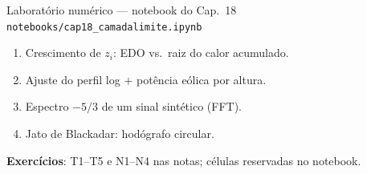 \documentclass[aspectratio=169,11pt]{beamer}
\begin{document}
\begin{frame}{Laboratório numérico --- notebook do Cap.~18}
  \texttt{notebooks/cap18\_camadalimite.ipynb}
  \begin{enumerate}
    \item Crescimento de $z_i$: EDO vs.\ raiz do calor acumulado.
    \item Ajuste do perfil log $+$ potência eólica por altura.
    \item Espectro $-5/3$ de um sinal sintético (FFT).
    \item Jato de Blackadar: hodógrafo circular.
  \end{enumerate}
  \vspace{0.4em}
  \textbf{Exercícios}: T1--T5 e N1--N4 nas notas; células reservadas no
  notebook.
  \vfill
  \atribuicao
\end{frame}
\end{document}
